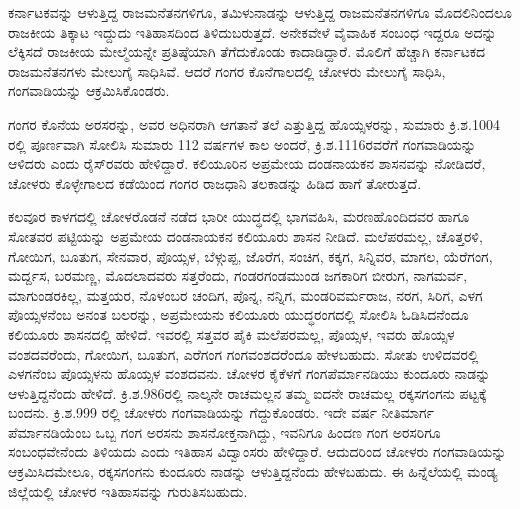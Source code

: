ಕರ್ನಾಟಕವನ್ನು ಆಳುತ್ತಿದ್ದ ರಾಜಮನೆತನಗಳಿಗೂ, ತಮಿಳುನಾಡನ್ನು ಆಳುತ್ತಿದ್ದ ರಾಜಮನೆತನಗಳಿಗೂ ಮೊದಲಿನಿಂದಲೂ ರಾಜಕೀಯ ತಿಕ್ಕಾಟ ಇದ್ದುದು ಇತಿಹಾಸದಿಂದ ತಿಳಿದುಬರುತ್ತದೆ. ಅನೇಕವೇಳೆ ವೈವಾಹಿಕ ಸಂಬಂಧ ಇದ್ದರೂ ಅದನ್ನು ಲೆಕ್ಕಿಸದೆ ರಾಜಕೀಯ ಮೇಲ್ಮೆಯನ್ನೇ ಪ್ರತಿಷ್ಠೆಯಾಗಿ ತೆಗೆದುಕೊಂಡು ಕಾದಾಡಿದ್ದಾರೆ. ಮೊಲಿಗೆ ಹೆಚ್ಚಾಗಿ ಕರ್ನಾಟಕದ ರಾಜಮನೆತನಗಳು ಮೇಲುಗೈ ಸಾಧಿಸಿವೆ. ಆದರೆ ಗಂಗರ ಕೊನೆಗಾಲದಲ್ಲಿ ಚೋಳರು ಮೇಲುಗೈ ಸಾಧಿಸಿ, ಗಂಗವಾಡಿಯನ್ನು ಆಕ್ರಮಿಸಿಕೊಂಡರು.

ಗಂಗರ ಕೊನೆಯ ಅರಸರನ್ನು, ಅವರ ಅಧಿನರಾಗಿ ಆಗತಾನೆ ತಲೆ ಎತ್ತುತ್ತಿದ್ದ ಹೊಯ್ಸಳರನ್ನು, ಸುಮಾರು ಕ್ರಿ.ಶ.1004 ರಲ್ಲಿ ಪೂರ್ಣವಾಗಿ ಸೋಲಿಸಿ ಸುಮಾರು 112 ವರ್ಷಗಳ ಕಾಲ ಅಂದರೆ, ಕ್ರಿ.ಶ.1116ರವರೆಗೆ ಗಂಗವಾಡಿಯನ್ನು ಆಳಿದರು ಎಂದು ರೈಸ್​ರವರು ಹೇಳಿದ್ದಾರೆ. ಕಲಿಯೂರಿನ ಅಪ್ರಮೇಯ ದಂಡನಾಯಕನ ಶಾಸನವನ್ನು ನೋಡಿದರೆ, ಚೋಳರು ಕೊಳ್ಳೇಗಾಲದ ಕಡೆಯಿಂದ ಗಂಗರ ರಾಜಧಾನಿ ತಲಕಾಡನ್ನು ಹಿಡಿದ ಹಾಗೆ ತೋರುತ್ತದೆ. 

ಕಲವೂರ ಕಾಳಗದಲ್ಲಿ ಚೋಳರೊಡನೆ ನಡೆದ ಭಾರೀ ಯುದ್ಧದಲ್ಲಿ ಭಾಗವಹಿಸಿ, ಮರಣಹೊಂದಿದವರ ಹಾಗೂ ಸೋತವರ ಪಟ್ಟಿಯನ್ನು ಅಪ್ರಮೇಯ ದಂಡನಾಯಕನ ಕಲಿಯೂರು ಶಾಸನ ನೀಡಿದೆ. ಮಲೆಪರಮಲ್ಲ, ಚೊತ್ತರಳಿ, ಗೋಯಿಗ, ಬೂತುಗ, ಸೇನವಾರ, ಪೊಯ್ಸಳ, ಬೆಳ್ಗುಪ್ಪ, ಜೊರೆಗ, ಸಂಚಿಗ, ಕಕ್ಕಗ, ಸಿನ್ನಿವರ, ಮಾಗಲ, ಯೆರೆಗಂಗ, ಮರ್ದ್ದಸ, ಬರಮಣ್ಣ, ಮೊದಲಾದವರು ಸತ್ತರೆಂದು, ಗಂಡರಗಂಡಮುಂಡ ಜಗಕಾರಿಗ ಬೀರುಗ, ನಾಗಮರ್ವ, ಮಾಗುಂಡರಕಿಲ್ಲ, ಮತ್ತಯರ, ನೊಳಂಬರ ಚಂದಿಗ, ಪೊನ್ನ, ನನ್ನಿಗ, ಮಂಡರಿವರ್ಮರಾಜ, ನರಗ, ಸಿರಿಗ, ಎಳಗ ಪೊಯ್ಸಳನೆಂಬ ಅನಂತ ಬಲರನ್ನು, ಅಪ್ರಮೇಯನು ಕಲಿಯೂರು ಯುದ್ಧರಂಗದಲ್ಲಿ ಸೋಲಿಸಿ ಓಡಿಸಿದನೆಂದೂ ಕಲಿಯೂರು ಶಾಸನದಲ್ಲಿ ಹೇಳಿದೆ. ಇವರಲ್ಲಿ ಸತ್ತವರ ಪೈಕಿ ಮಲೆಪರಮಲ್ಲ, ಪೊಯ್ಸಳ, ಇವರು ಹೊಯ್ಸಳ ವಂಶದವರೆಂದು, ಗೋಯಿಗ, ಬೂತುಗ, ಎರೆಗಂಗ ಗಂಗವಂಶದರೆಂದೂ ಹೇಳಬಹುದು. ಸೋತು ಉಳಿದವರಲ್ಲಿ ಎಳಗನೆಂಬ ಪೊಯ್ಸಳನು ಹೊಯ್ಸಳ ವಂಶದವನು. ಚೋಳರ ಕೈಕೆಳಗೆ ಗಂಗಪೆರ್ಮಾನಡಿಯು ಕುಂದೂರು ನಾಡನ್ನು ಆಳುತ್ತಿದ್ದನೆಂದು ಹೇಳಿದೆ. ಕ್ರಿ.ಶ.986ರಲ್ಲಿ ನಾಲ್ಕನೇ ರಾಚಮಲ್ಲನ ತಮ್ಮ ಐದನೇ ರಾಚಮಲ್ಲ ರಕ್ಕಸಗಂಗನು ಪಟ್ಟಕ್ಕೆ ಬಂದನು. ಕ್ರಿ.ಶ.999 ರಲ್ಲಿ ಚೋಳರು ಗಂಗವಾಡಿಯನ್ನು ಗೆದ್ದುಕೊಂಡರು. ಇದೇ ವರ್ಷ ನೀತಿಮಾರ್ಗ ಪೆರ್ಮಾನಡಿಯೆಂಬ ಒಬ್ಬ ಗಂಗ ಅರಸನು ಶಾಸನೋಕ್ತನಾಗಿದ್ದು, ಇವನಿಗೂ ಹಿಂದಣ ಗಂಗ ಅರಸರಿಗೂ ಸಂಬಂಧವೇನೆಂದು ತಿಳಿಯದು ಎಂದು ಇತಿಹಾಸ ವಿದ್ವಾಂಸರು ಹೇಳಿದ್ದಾರೆ. ಆದುದರಿಂದ ಚೋಳರು ಗಂಗವಾಡಿಯನ್ನು ಆಕ್ರಮಿಸಿದಮೇಲೂ, ರಕ್ಕಸಗಂಗನು ಕುಂದೂರು ನಾಡನ್ನು ಆಳುತ್ತಿದ್ದನೆಂದು ಹೇಳಬಹುದು. ಈ ಹಿನ್ನೆಲೆಯಲ್ಲಿ ಮಂಡ್ಯ ಜಿಲ್ಲೆಯಲ್ಲಿ ಚೋಳರ ಇತಿಹಾಸವನ್ನು ಗುರುತಿಸಬಹುದು.


